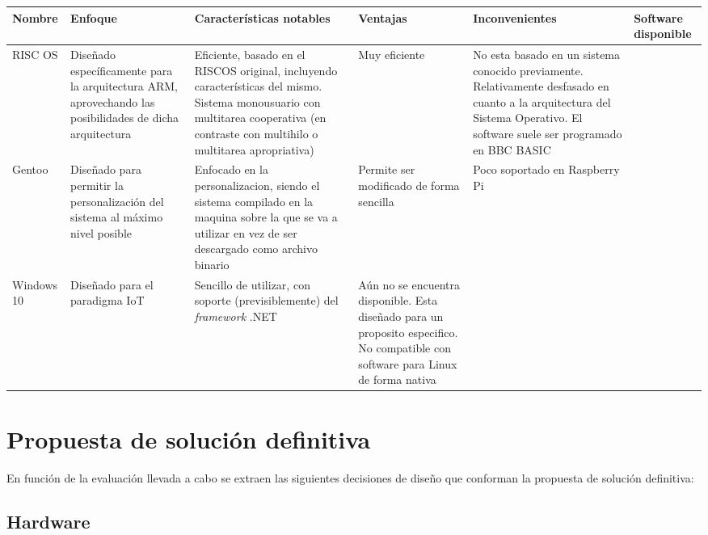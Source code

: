 \begin{landscape}
\begin{table}[h]
\begin{tabular}{|p{2cm}|p{4cm}|p{5cm}|p{3cm}|p{4cm}|p{4cm}|}
\hline
Nombre & Enfoque & Características notables & Ventajas & Inconvenientes & Software disponible\\ \hline

RISC OS & Diseñado específicamente para la arquitectura ARM, aprovechando las posibilidades de dicha arquitectura & Eficiente, basado en el RISCOS original, incluyendo características del mismo. Sistema monousuario con multitarea cooperativa (en contraste con multihilo o multitarea apropriativa) & Muy eficiente & No esta basado en un sistema conocido previamente. Relativamente desfasado en cuanto a la arquitectura del Sistema Operativo. El software suele ser programado en BBC BASIC & \\ \hline

Gentoo & Diseñado para permitir la personalización del sistema al máximo nivel posible & Enfocado en la personalizacion, siendo el sistema compilado en la maquina sobre la que se va a utilizar en vez de ser descargado como archivo binario & Permite ser modificado de forma sencilla & Poco soportado en Raspberry Pi & \\ \hline

Windows 10 & Diseñado para el paradigma IoT & Sencillo de utilizar, con soporte (previsiblemente) del \textit{framework} .NET & Aún no se encuentra disponible\cite{windows10raspberry}. Esta diseñado para un proposito especifico. No compatible con software para Linux de forma nativa & & \\ \hline

\end{tabular}
\end{table}
\end{landscape}


\section{Propuesta de solución definitiva}

En función de la evaluación llevada a cabo se extraen las siguientes decisiones de diseño que conforman la propuesta de solución definitiva:

\subsection{Hardware}

